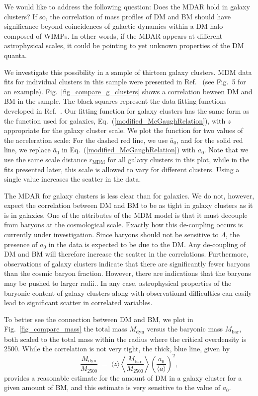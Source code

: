 \documentclass{bjp}
\newcommand{\ac}{\bar{a}_0}
\newcommand{\vev}[1]{\langle #1 \rangle}
\begin{document}
We would like to address the following question: Does the MDAR hold in galaxy clusters? If so, the correlation of mass profiles of DM and BM should have significance beyond coincidences of galactic dynamics within a DM halo composed of WIMPs. In other words, if the MDAR appears at different astrophysical scales, it could be pointing to yet unknown properties of the DM quanta.

We investigate this possibility in a sample of thirteen galaxy clusters. MDM data fits for individual clusters in this sample were presented in Ref.~ (see Fig.~5 for an example).
Fig.~\ref{fig_compare_g_clusters} shows a correlation beween DM and BM in the sample. The black squares represent the data fitting functions developed in Ref.~. Our fitting function for galaxy clusters has the same form as the function used for galaxies, Eq.~(\ref{modified_McGaughRelation}), with $z$ appropriate for the galaxy cluster scale. We plot the function for two values of the acceleration scale: For the dashed red line, we use $\ac$, and for the solid red line, we replace $\ac$ in Eq.~(\ref{modified_McGaughRelation}) with $a_0$. Note that we use the same scale distance $r_\mathrm{MDM}$ for all galaxy clusters in this plot, while in the fits presented later, this scale is allowed to vary for different clusters. Using a single value increases the scatter in the data.

The MDAR for galaxy clusters is less clear than for galaxies. We do not, however, expect the correlation between DM and BM to be as tight in galaxy clusters as it is in galaxies. One of the attributes of the MDM model is that it must decouple from baryons at the cosmological scale. Exactly how this de-coupling occurs is currently under investigation. 
Since baryons should not be sensitive to $\Lambda$, 
the presence of $a_0$ in the data is expected to be due to the DM. Any de-coupling of DM and BM will therefore increase the scatter in the correlations. Furthermore, observations of galaxy clusters indicate that there are significantly fewer baryons than the cosmic baryon fraction. However, there are indications that the baryons may be pushed to larger radii.\cite{Rasheed:2010pq}. In any case, astrophysical properties of the baryonic content of galaxy clusters along with observational difficulties can easily lead to significant scatter in correlated variables.

To better see the connection between DM and BM, we plot in Fig.~\ref{fig_compare_mass} the total mass $M_\mathrm{dyn}$ versus the baryonic mass $M_\mathrm{bar}$, both scaled to the total mass within the radius where the critical overdensity is 2500. While the correlation is not very tight, the thick, blue line, given by
%
\begin{equation}
\frac{M_\mathrm{dyn}}{M_{2500}} \;=\; 
\vev{z} \left\langle \frac{M_\mathrm{bar}}{M_{2500}} \right\rangle
\left( \frac{a_0}{ \vev{a} } \right)^2 ,
\end{equation}
%
provides a reasonable estimate for the amount of DM in a galaxy cluster for a given amount of BM, and this estimate is very sensitive to the value of $a_0$.
\end{document}
